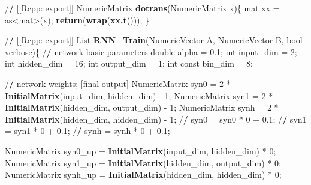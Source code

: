 \documentclass[]{article}
\newenvironment{Shaded}{\begin{snugshade}}{\end{snugshade}}
\newcommand{\KeywordTok}[1]{\textcolor[rgb]{0.13,0.29,0.53}{\textbf{{#1}}}}
\newcommand{\DecValTok}[1]{\textcolor[rgb]{0.00,0.00,0.81}{{#1}}}
\newcommand{\FloatTok}[1]{\textcolor[rgb]{0.00,0.00,0.81}{{#1}}}
\newcommand{\StringTok}[1]{\textcolor[rgb]{0.31,0.60,0.02}{{#1}}}
\newcommand{\ErrorTok}[1]{\textcolor[rgb]{0.64,0.00,0.00}{\textbf{{#1}}}}
\newcommand{\NormalTok}[1]{{#1}}
\begin{document}
\begin{Shaded}
\begin{Highlighting}[]
{{\NormalTok{/}\ErrorTok{/}\StringTok{ }\NormalTok{[[Rcpp::export]]}
\NormalTok{NumericMatrix }\KeywordTok{dotrans}\NormalTok{(NumericMatrix x)\{}
  \NormalTok{mat xx =}\StringTok{ }\NormalTok{as<mat>(x);}
  \KeywordTok{return}\NormalTok{(}\KeywordTok{wrap}\NormalTok{(}\KeywordTok{xx.t}\NormalTok{()));}
\NormalTok{\}}

\NormalTok{/}\ErrorTok{/}\StringTok{ }\NormalTok{[[Rcpp::export]]}
\NormalTok{List }\KeywordTok{RNN_Train}\NormalTok{(NumericVector A, NumericVector B, bool verbose)\{}
  \NormalTok{/}\ErrorTok{/}\StringTok{ }\NormalTok{network basic parameters}
  \NormalTok{double alpha =}\StringTok{ }\FloatTok{0.1}\NormalTok{;}
  \NormalTok{int input_dim =}\StringTok{ }\DecValTok{2}\NormalTok{;}
  \NormalTok{int hidden_dim =}\StringTok{ }\DecValTok{16}\NormalTok{;}
  \NormalTok{int output_dim =}\StringTok{ }\DecValTok{1}\NormalTok{;}
  \NormalTok{int const bin_dim =}\StringTok{ }\DecValTok{8}\NormalTok{;}

  \NormalTok{/}\ErrorTok{/}\StringTok{ }\NormalTok{network weights; [final output]}
  \NormalTok{NumericMatrix syn0 =}\StringTok{ }\DecValTok{2} \NormalTok{*}\StringTok{ }\KeywordTok{InitialMatrix}\NormalTok{(input_dim, hidden_dim) -}\StringTok{ }\DecValTok{1}\NormalTok{;}
  \NormalTok{NumericMatrix syn1 =}\StringTok{ }\DecValTok{2} \NormalTok{*}\StringTok{ }\KeywordTok{InitialMatrix}\NormalTok{(hidden_dim, output_dim) -}\StringTok{ }\DecValTok{1}\NormalTok{;}
  \NormalTok{NumericMatrix synh =}\StringTok{ }\DecValTok{2} \NormalTok{*}\StringTok{ }\KeywordTok{InitialMatrix}\NormalTok{(hidden_dim, hidden_dim) -}\StringTok{ }\DecValTok{1}\NormalTok{;}
\NormalTok{/}\ErrorTok{/}\StringTok{   }\NormalTok{syn0 =}\StringTok{ }\NormalTok{syn0 *}\StringTok{ }\DecValTok{0} \NormalTok{+}\StringTok{ }\FloatTok{0.1}\NormalTok{;}
\NormalTok{/}\ErrorTok{/}\StringTok{   }\NormalTok{syn1 =}\StringTok{ }\NormalTok{syn1 *}\StringTok{ }\DecValTok{0} \NormalTok{+}\StringTok{ }\FloatTok{0.1}\NormalTok{;}
\NormalTok{/}\ErrorTok{/}\StringTok{   }\NormalTok{synh =}\StringTok{ }\NormalTok{synh *}\StringTok{ }\DecValTok{0} \NormalTok{+}\StringTok{ }\FloatTok{0.1}\NormalTok{;}

  \NormalTok{NumericMatrix syn0_up =}\StringTok{ }\KeywordTok{InitialMatrix}\NormalTok{(input_dim, hidden_dim) *}\StringTok{ }\DecValTok{0}\NormalTok{;}
  \NormalTok{NumericMatrix syn1_up =}\StringTok{ }\KeywordTok{InitialMatrix}\NormalTok{(hidden_dim, output_dim) *}\StringTok{ }\DecValTok{0}\NormalTok{;}
  \NormalTok{NumericMatrix synh_up =}\StringTok{ }\KeywordTok{InitialMatrix}\NormalTok{(hidden_dim, hidden_dim) *}\StringTok{ }\DecValTok{0}\NormalTok{;}

}}
\end{Highlighting}
\end{Shaded}
\end{document}
